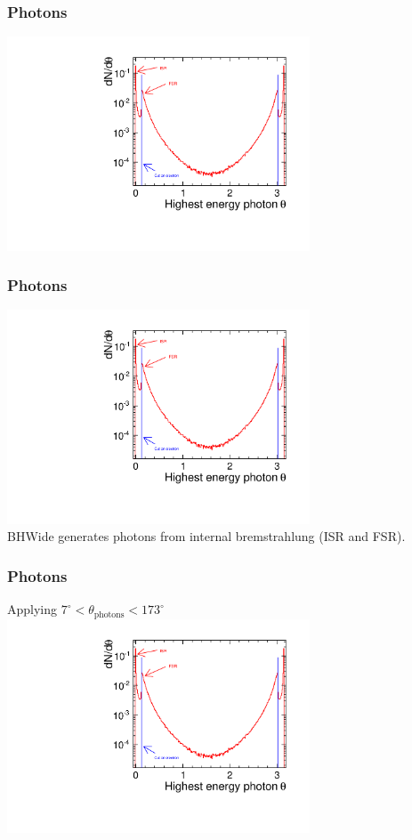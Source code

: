 \documentclass{beamer}
\begin{document}
\begin{frame}
\frametitle{Photons}
\includegraphics[width=9cm,page=3]{BHWideAnalysis.pdf}
\end{frame}
\begin{frame}
\frametitle{Photons}
\includegraphics[width=9cm,page=1]{BHWideAnalysis.pdf}\\
BHWide generates photons from internal bremstrahlung (ISR and FSR).
\end{frame}
\begin{frame}
\frametitle{Photons}
Applying $7^\circ<\theta_{\textrm{photons}}<173^\circ$\\
\includegraphics[width=9cm,page=2]{BHWideAnalysis.pdf}
\end{frame}
\end{document}
